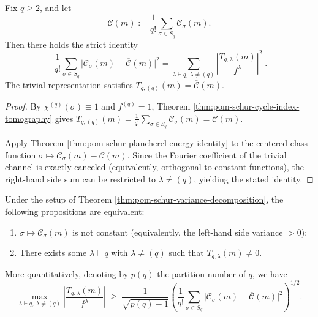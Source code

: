 \begin{theorem}\label{thm:pom-schur-variance-decomposition}
Fix \(q\ge 2\), and let
\[
\overline{\mathcal C}(m):=\frac{1}{q!}\sum_{\sigma\in S_q}\mathcal{C}_\sigma(m).
\]
Then there holds the strict identity
\[
\boxed{\;
\frac{1}{q!}\sum_{\sigma\in S_q}\bigl|\mathcal{C}_\sigma(m)-\overline{\mathcal C}(m)\bigr|^2
=\sum_{\lambda\vdash q,\ \lambda\ne(q)}\left|\frac{T_{q,\lambda}(m)}{f^\lambda}\right|^2\; }.
\]
The trivial representation satisfies \(T_{q,(q)}(m)=\overline{\mathcal C}(m)\).
\end{theorem}
\begin{proof}
By \(\chi^{(q)}(\sigma)\equiv 1\) and \(f^{(q)}=1\), Theorem \ref{thm:pom-schur-cycle-index-tomography} gives
\(
T_{q,(q)}(m)=\frac{1}{q!}\sum_{\sigma\in S_q}\mathcal C_\sigma(m)=\overline{\mathcal C}(m)
\).
\par
Apply Theorem \ref{thm:pom-schur-plancherel-energy-identity} to the centered class function
\(\sigma\mapsto \mathcal C_\sigma(m)-\overline{\mathcal C}(m)\).
Since the Fourier coefficient of the trivial channel is exactly canceled (equivalently, orthogonal to constant functions), the right-hand side sum can be restricted to \(\lambda\ne(q)\), yielding the stated identity.
\end{proof}

\begin{corollary}\label{cor:pom-schur-nontrivial-channel-activation}
Under the setup of Theorem \ref{thm:pom-schur-variance-decomposition}, the following propositions are equivalent:
\begin{enumerate}
  \item \(\sigma\mapsto \mathcal C_\sigma(m)\) is not constant (equivalently, the left-hand side variance \(>0\));
  \item There exists some \(\lambda\vdash q\) with \(\lambda\ne(q)\) such that \(T_{q,\lambda}(m)\ne 0\).
\end{enumerate}
More quantitatively, denoting by \(p(q)\) the partition number of \(q\), we have
\[
\max_{\lambda\vdash q,\ \lambda\ne(q)}\left|\frac{T_{q,\lambda}(m)}{f^\lambda}\right|
\ \ge\
\frac{1}{\sqrt{p(q)-1}}\left(\frac{1}{q!}\sum_{\sigma\in S_q}\bigl|\mathcal{C}_\sigma(m)-\overline{\mathcal C}(m)\bigr|^2\right)^{1/2}.
\]
\end{corollary}

